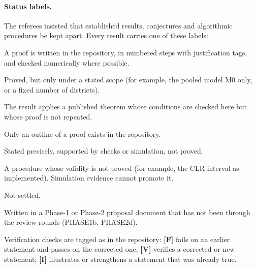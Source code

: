 \paragraph{Status labels.} The referees insisted that established results,
conjectures and algorithmic procedures be kept apart. Every result carries one
of these labels:
\begin{description}[nosep,font=\normalfont\sffamily]
\item[Proved] A proof is written in the repository, in numbered steps with
justification tags, and checked numerically where possible.
\item[Proved under conditions] Proved, but only under a stated scope (for
example, the pooled model M0 only, or a fixed number of districts).
\item[Cited] The result applies a published theorem whose conditions are
checked here but whose proof is not repeated.
\item[Sketch] Only an outline of a proof exists in the repository.
\item[Conjecture] Stated precisely, supported by checks or simulation, not
proved.
\item[Algorithm] A procedure whose validity is not proved (for example, the
CLR interval as implemented). Simulation evidence cannot promote it.
\item[Open] Not settled.
\item[Proposal] Written in a Phase-1 or Phase-2 proposal document that has not
been through the review rounds (PHASE1b, PHASE2d).
\end{description}
Verification checks are tagged as in the repository: \textbf{[F]} fails on an
earlier statement and passes on the corrected one; \textbf{[V]} verifies a
corrected or new statement; \textbf{[I]} illustrates or strengthens a
statement that was already true.
